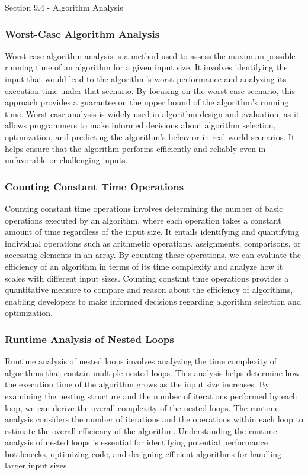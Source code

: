 \begin{notes}{Section 9.4 - Algorithm Analysis}
    \subsubsection*{Worst-Case Algorithm Analysis}

    Worst-case algorithm analysis is a method used to assess the maximum possible running time of an algorithm for a given input size. It involves identifying the input that would lead to the algorithm's worst performance and analyzing its execution time under that scenario. By focusing on the worst-case scenario, this approach provides a guarantee on the upper bound of the algorithm's running time. Worst-case analysis is widely used 
    in algorithm design and evaluation, as it allows programmers to make informed decisions about algorithm selection, optimization, and predicting the algorithm's behavior in real-world scenarios. It helps ensure that the algorithm performs efficiently and reliably even in unfavorable or challenging inputs.
    
    \subsubsection*{Counting Constant Time Operations}
    
    Counting constant time operations involves determining the number of basic operations executed by an algorithm, where each operation takes a constant amount of time regardless of the input size. It entails identifying and quantifying individual operations such as arithmetic operations, assignments, comparisons, or accessing elements in an array. By counting these operations, we can evaluate the efficiency of an algorithm in terms 
    of its time complexity and analyze how it scales with different input sizes. Counting constant time operations provides a quantitative measure to compare and reason about the efficiency of algorithms, enabling developers to make informed decisions regarding algorithm selection and optimization.
    
    \subsubsection*{Runtime Analysis of Nested Loops}
    
    Runtime analysis of nested loops involves analyzing the time complexity of algorithms that contain multiple nested loops. This analysis helps determine how the execution time of the algorithm grows as the input size increases. By examining the nesting structure and the number of iterations performed by each loop, we can derive the overall complexity of the nested loops. The runtime analysis considers the number of iterations and the 
    operations within each loop to estimate the overall efficiency of the algorithm. Understanding the runtime analysis of nested loops is essential for identifying potential performance bottlenecks, optimizing code, and designing efficient algorithms for handling larger input sizes.
    

\end{notes}
